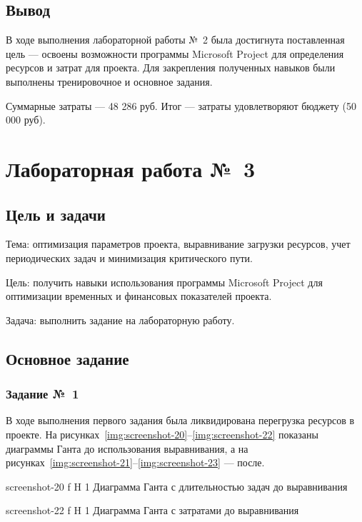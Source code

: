 \documentclass{bmstu}
\begin{document}
\section{Вывод}

В ходе выполнения лабораторной работы №~2 была достигнута поставленная цель --- освоены возможности программы Microsoft Project для определения ресурсов и затрат для проекта. 
Для закрепления полученных навыков были выполнены тренировочное и основное задания.

Суммарные затраты --- 48 286 руб. 
Итог --- затраты удовлетворяют бюджету (50 000 руб).

\chapter{Лабораторная работа №~3}

\section{Цель и задачи}

Тема: оптимизация параметров проекта, выравнивание загрузки ресурсов, учет периодических задач и минимизация критического пути.

Цель: получить навыки использования программы Microsoft Project для оптимизации временных и финансовых показателей проекта.

Задача: выполнить задание на лабораторную работу.

\section{Основное задание}

\subsection{Задание №~1}

В ходе выполнения первого задания была ликвидирована перегрузка ресурсов в проекте. 
На рисунках~\ref{img:screenshot-20}--\ref{img:screenshot-22} показаны диаграммы Ганта до использования выравнивания, а на рисунках~\ref{img:screenshot-21}--\ref{img:screenshot-23} --- после.
    
    {screenshot-20}
    {f}
    {H}
    {1\textwidth}
    {Диаграмма Ганта с длительностью задач до выравнивания}
    
    {screenshot-22}
    {f}
    {H}
    {1\textwidth}
    {Диаграмма Ганта с затратами до выравнивания}
    
\end{document}
